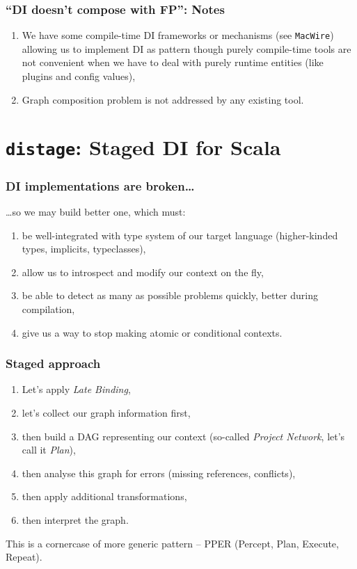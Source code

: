 \documentclass[usenames,dvipsnames]{beamer}
\newcommand{\distage}{\texttt{distage}\xspace}
\begin{document}
\begin{frame}
\frametitle{``DI doesn't compose with FP'': Notes}
\begin{enumerate}
\item We have some compile-time DI frameworks or mechanisms (see \texttt{MacWire}) allowing us to implement DI as pattern 
      though purely compile-time tools are not convenient when we have to deal with purely runtime entities 
      (like plugins and config values),
\item Graph composition problem is not addressed by any existing tool.
\end{enumerate}
\end{frame}

\section{\distage: Staged DI for Scala}

\begin{frame}
\frametitle{DI implementations are broken\dots}
\dots so we may build better one, which must:
\begin{enumerate}
\item be well-integrated with type system of our target language (higher-kinded types, implicits, typeclasses),
\item allow us to introspect and modify our context on the fly,
\item be able to detect as many as possible problems quickly, better during compilation,
\item give us a way to stop making atomic or conditional contexts.
\end{enumerate}
\end{frame}

\begin{frame}
\frametitle{Staged approach}
\begin{enumerate}
\item Let's apply \textit{Late Binding},
\item let's collect our graph information first,
\item then build a DAG representing our context (so-called \textit{Project Network}, let's call it \textit{Plan}),
\item then analyse this graph for errors (missing references, conflicts),
\item then apply additional transformations,
\item then interpret the graph.
\end{enumerate}
This is a cornercase of more generic pattern -- PPER (Percept, Plan, Execute, Repeat).
\end{frame}
\end{document}
